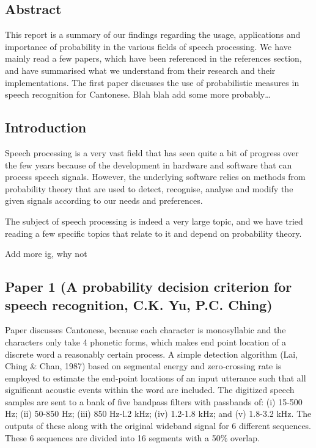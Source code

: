 \hypertarget{abstract}{%
\subsection{Abstract}\label{abstract}}

This report is a summary of our findings regarding the usage,
applications and importance of probability in the various fields of
speech processing. We have mainly read a few papers, which have been
referenced in the references section, and have summarised what we
understand from their research and their implementations. The first
paper discusses the use of probabilistic measures in speech recognition
for Cantonese. Blah blah add some more probably\ldots{}

\hypertarget{introduction}{%
\subsection{Introduction}\label{introduction}}

Speech processing is a very vast field that has seen quite a bit of
progress over the few years because of the development in hardware and
software that can process speech signals. However, the underlying
software relies on methods from probability theory that are used to
detect, recognise, analyse and modify the given signals according to our
needs and preferences.

The subject of speech processing is indeed a very large topic, and we
have tried reading a few specific topics that relate to it and depend on
probability theory.

Add more ig, why not

\hypertarget{paper-1-a-probability-decision-criterion-for-speech-recognition-c.k.-yu-p.c.-ching}{%
\subsection{Paper 1 (A probability decision criterion for speech
recognition, C.K. Yu, P.C.
Ching)}\label{paper-1-a-probability-decision-criterion-for-speech-recognition-c.k.-yu-p.c.-ching}}

Paper discusses Cantonese, because each character is monosyllabic and
the characters only take 4 phonetic forms, which makes end point
location of a discrete word a reasonably certain process. A simple
detection algorithm (Lai, Ching \& Chan, 1987) based on segmental energy
and zero-crossing rate is employed to estimate the end-point locations
of an input utterance such that all significant acoustic events within
the word are included. The digitized speech samples are sent to a bank
of five bandpass filters with passbands of: (i) 15-500 Hz; (ii) 50-850
Hz; (iii) 850 Hz-l.2 kHz; (iv) 1.2-1.8 kHz; and (v) 1.8-3.2 kHz. The
outputs of these along with the original wideband signal for 6 different
sequences. These 6 sequences are divided into 16 segments with a 50\%
overlap.

